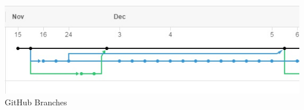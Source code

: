 \documentclass[a4paper]{report}
\begin{document}
\section{}
\pagebreak
\section{}
\pagebreak
\section{}
\subsection{}
\includegraphics[width=1.0\linewidth]{./appendixImages/GitHubScreenShot01}
GitHub Branches
\pagebreak
\section{}
\end{document}

